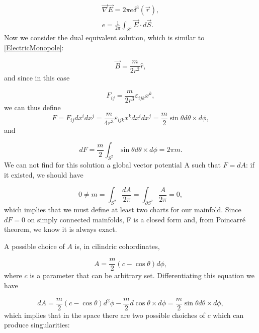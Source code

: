 \documentclass[main.tex]{subfiles}
\begin{document}
\begin{align}
\vec \nabla \vec E=2\pi e \delta^3(\vec r),\\
e=\frac{1}{2\pi}\int_{S^2}\vec E \cdot d\vec S.
\end{align}
Now we consider the dual equivalent solution, which is similar to \eqref{ElectricMonopole}:

\begin{equation}\label{MagneticMonopole}
\vec B=\frac{m}{2r^2}\hat{r},
\end{equation}
and since in this case

\begin{equation}
F_{ij}=\frac{m}{2r^3}\varepsilon_{ijk}x^k,
\end{equation}
we can thus define
\begin{equation}
F=F_{ij}dx^idx^j=\frac{m}{4r^3}\varepsilon_{ijk}x^kdx^idx^j=\frac{m}{2}\sin\theta d\theta\times d\phi,
\end{equation}
and

\begin{equation}
dF=\frac{m}{2}\int_{S^2}\sin\theta d\theta\times d\phi=2\pi m.
\end{equation}
We can not find for this solution a global vector potential A such that $F=dA$: if it existed, we should have

\begin{equation}
0\neq m=\int_{S^2}\frac{dA}{2\pi}=\int_{\partial S^2}\frac{A}{2\pi}=0,
\end{equation}
which implies that we must define at least two charts for our mainfold.
Since $dF=0$ on simply connected mainfolds, F is a closed form and, from Poincarré theorem, we know it is always exact.

A possible choice of $A$ is, in cilindric cohordinates,

\begin{equation}
A=\frac{m}{2}\left(c-\cos\theta\right)d\phi,
\end{equation}
where $c$ is a parameter that can be arbitrary set. Differentiating this equation we have

\begin{equation}
dA=\frac{m}{2}\left(c-\cos\theta\right)d^2\phi-\frac{m}{2}d\cos\theta\times d \phi=\frac{m}{2}\sin\theta d\theta\times d \phi,
\end{equation}
which implies that in the space there are two possible choiches of $c$ which can produce singularities:
\end{document}
